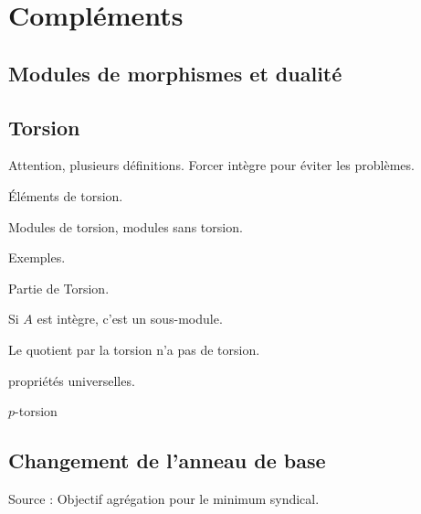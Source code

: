 
\chapter{Compléments}


\section{Modules de morphismes et dualité}

\section{Torsion}
Attention, plusieurs définitions. Forcer intègre pour éviter les problèmes.

Éléments de torsion. 

Modules de torsion, modules sans torsion.

Exemples.

Partie de Torsion.

Si $A$ est intègre, c'est un sous-module.

Le quotient par la torsion n'a pas de torsion.

propriétés universelles.

$p$-torsion

\section{Changement de l'anneau de base}

Source :  Objectif agrégation pour le minimum syndical.


